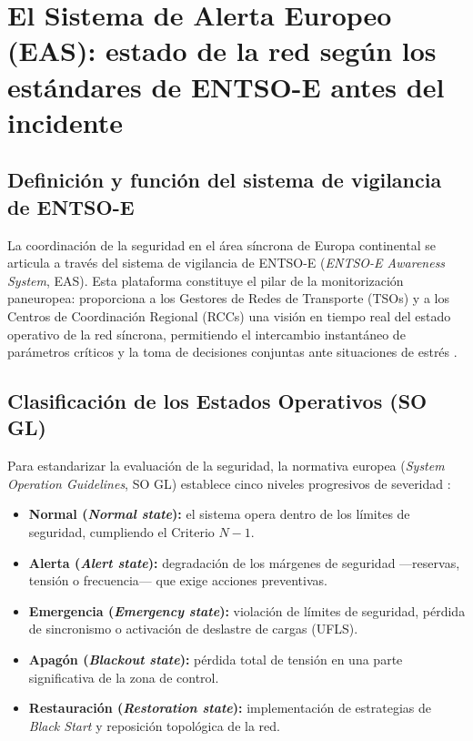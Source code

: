 \clearpage

\section{El Sistema de Alerta Europeo (EAS): estado de la red según los estándares
de ENTSO-E antes del incidente}
\label{sec:eas_entsoe}

\subsection{Definición y función del sistema de vigilancia de ENTSO-E}

La coordinación de la seguridad en el área síncrona de Europa continental se
articula a través del sistema de vigilancia de ENTSO-E (\textit{ENTSO-E
Awareness System}, EAS). Esta plataforma constituye el pilar de la
monitorización paneuropea: proporciona a los Gestores de Redes de Transporte
(TSOs) y a los Centros de Coordinación Regional (RCCs) una visión en tiempo
real del estado operativo de la red síncrona, permitiendo el intercambio
instantáneo de parámetros críticos y la toma de decisiones conjuntas ante
situaciones de estrés \cite{entsoe2025}.

\subsection{Clasificación de los Estados Operativos (SO GL)}

Para estandarizar la evaluación de la seguridad, la normativa europea
(\textit{System Operation Guidelines}, SO GL) establece cinco niveles progresivos
de severidad \cite{entsoe2025}:

\begin{itemize}
    \item \textbf{Normal (\textit{Normal state}):} el sistema opera dentro de los
    límites de seguridad, cumpliendo el Criterio $N-1$.

    \item \textbf{Alerta (\textit{Alert state}):} degradación de los márgenes de
    seguridad ---reservas, tensión o frecuencia--- que exige acciones preventivas.

    \item \textbf{Emergencia (\textit{Emergency state}):} violación de límites de
    seguridad, pérdida de sincronismo o activación de deslastre de cargas (UFLS).

    \item \textbf{Apagón (\textit{Blackout state}):} pérdida total de tensión en
    una parte significativa de la zona de control.

    \item \textbf{Restauración (\textit{Restoration state}):} implementación de
    estrategias de \textit{Black Start} y reposición topológica de la red.
\end{itemize}

